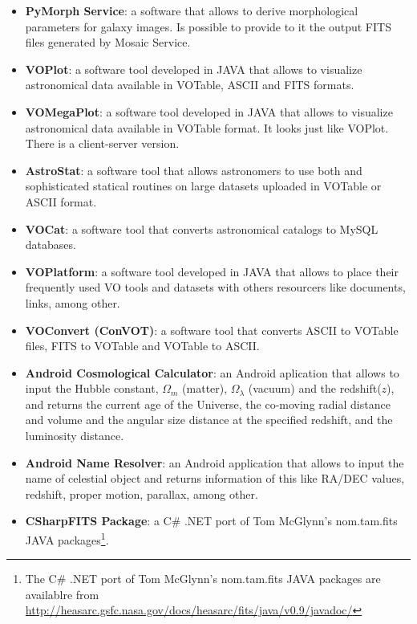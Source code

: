 \begin{itemize}
\item \textbf{PyMorph Service}:
a software that allows to derive morphological parameters for galaxy images. Is
possible to provide to it the output FITS files generated by Mosaic Service.

\item \textbf{VOPlot}:
a software tool developed in JAVA that allows to visualize astronomical data
available in VOTable, ASCII and FITS formats.

\item \textbf{VOMegaPlot}:
a software tool developed in JAVA that allows to visualize astronomical data
available in VOTable format. It looks just like VOPlot. There is a client-server
version.

\item \textbf{AstroStat}:
a software tool that allows astronomers to use both and sophisticated statical
routines on large datasets uploaded in VOTable or ASCII format.

\item \textbf{VOCat}:
a software tool that converts astronomical catalogs to MySQL databases. 

\item \textbf{VOPlatform}:
a software tool developed in JAVA that allows to place their frequently used VO
tools and datasets with others resourcers like documents, links, among other.

\item \textbf{VOConvert (ConVOT)}:
a software tool that converts ASCII to VOTable files, FITS to VOTable and
VOTable to ASCII.

\item \textbf{Android Cosmological Calculator}:
an Android aplication that allows to input the Hubble constant, $ \Omega_{m} $
(matter), $ \Omega_{\lambda} $ (vacuum) and the redshift($ z $), and returns the
current age of the Universe, the co-moving radial distance and volume and the
angular size distance at the specified redshift, and the luminosity distance.

\item \textbf{Android Name Resolver}:
an Android application that allows to input the name of celestial object and
returns information of this like RA/DEC values, redshift, proper motion,
parallax, among other.

\item \textbf{CSharpFITS Package}:
a C\# .NET port of Tom McGlynn's nom.tam.fits JAVA packages\footnote{The C\#
.NET port of Tom McGlynn's nom.tam.fits JAVA packages are availablre from
\url{http://heasarc.gsfc.nasa.gov/docs/heasarc/fits/java/v0.9/javadoc/}}.


\end{itemize}
